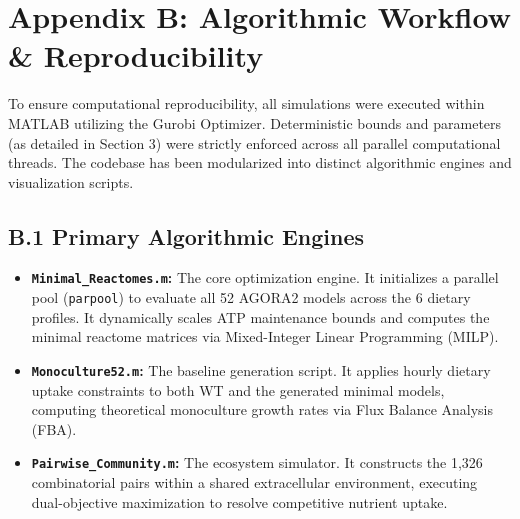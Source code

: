 \documentclass[11pt, a4paper]{article}
\begin{document}
\section{Appendix B: Algorithmic Workflow \& Reproducibility}
To ensure computational reproducibility, all simulations were executed within MATLAB utilizing the Gurobi Optimizer. Deterministic bounds and parameters (as detailed in Section 3) were strictly enforced across all parallel computational threads. The codebase has been modularized into distinct algorithmic engines and visualization scripts.

\subsection{B.1 Primary Algorithmic Engines}
\begin{itemize}[itemsep=4pt, parsep=0pt]
    \item \textbf{\texttt{Minimal\_Reactomes.m}:} The core optimization engine. It initializes a parallel pool (\texttt{parpool}) to evaluate all 52 AGORA2 models across the 6 dietary profiles. It dynamically scales ATP maintenance bounds and computes the minimal reactome matrices via Mixed-Integer Linear Programming (MILP).
    \item \textbf{\texttt{Monoculture52.m}:} The baseline generation script. It applies hourly dietary uptake constraints to both WT and the generated minimal models, computing theoretical monoculture growth rates via Flux Balance Analysis (FBA).
    \item \textbf{\texttt{Pairwise\_Community.m}:} The ecosystem simulator. It constructs the 1,326 combinatorial pairs within a shared extracellular environment, executing dual-objective maximization to resolve competitive nutrient uptake.
\end{itemize}
\end{document}
